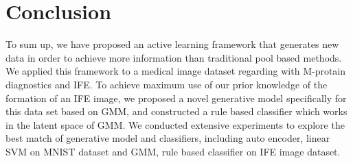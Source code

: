 \documentclass[10pt,twocolumn,letterpaper]{article}
\begin{document}
\section{Conclusion}
To sum up, we have proposed an active learning framework that generates new data in order to achieve more information than traditional pool based methods. We applied this framework to a medical image dataset regarding with M-protain diagnostics and IFE. To achieve maximum use of our prior knowledge of the formation of an IFE image, we proposed a novel generative model specifically for this data set based on GMM, and constructed a rule based classifier which works in the latent space of GMM. We conducted extensive experiments to explore the best match of generative model and classifiers, including auto encoder, linear SVM on MNIST dataset and GMM, rule based classifier on IFE image dataset.


{\small


}
\end{document}
